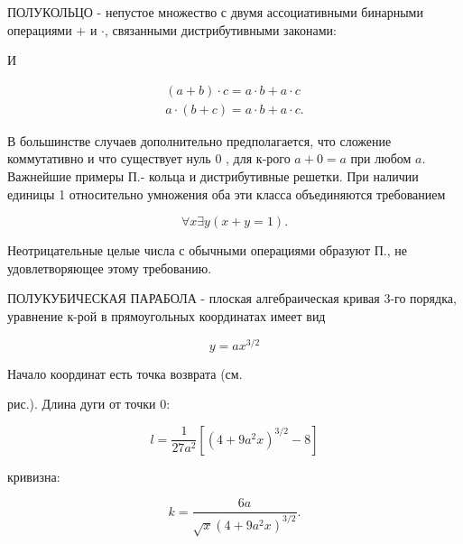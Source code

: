 \documentclass[10pt]{article}
\begin{document}
ПОЛУКОЛЬЦО - непустое множество с двумя ассоциативными бинарными операциями + и $\cdot$, связанными дистрибутивными законами:



И



\[

\begin{gathered}

(a+b) \cdot c=a \cdot b+a \cdot c \\

a \cdot(b+c)=a \cdot b+a \cdot c .

\end{gathered}

\]



В большинстве случаев дополнительно предполагается, что сложение коммутативно и что существует нуль 0 , для к-рого $a+0=a$ при любом $a$. Важнейшие примеры П.- кольца и дистрибутивные решетки. При наличии единицы 1 относительно умножения оба эти класса объединяются требованием



\[

\forall x \exists y(x+y=1) .

\]



Неотрицательные целые числа с обычными операциями образуют П., не удовлетворяющее этому требованию.



ПОЛУКУБИЧЕСКАЯ ПАРАБОЛА - плоская алгебраическая кривая 3-го порядка, уравнение к-рой в прямоугольных координатах имеет вид



\[

y=a x^{3 / 2}

\]



Начало координат есть точка возврата (см.



рис.). Длина дуги от точки 0:



\[

l=\frac{1}{27 a^{2}}\left[\left(4+9 a^{2} x\right)^{3 / 2}-8\right]

\]



кривизна:



\[

k=\frac{6 a}{\sqrt{x}\left(4+9 a^{2} x\right)^{3 / 2}} .

\]
\end{document}
